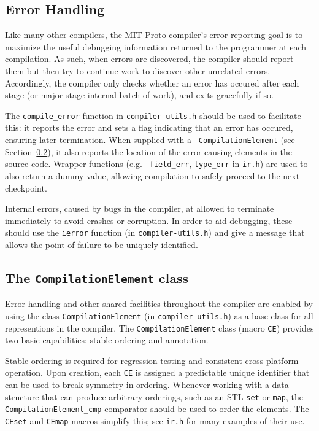 \documentclass{article}
\newcommand\file[1]{{\tt #1}}
\begin{document}
\subsection{Error Handling}

Like many other compilers, the MIT Proto compiler's error-reporting goal is to
maximize the useful debugging information returned to the programmer at each
compilation.  As such, when errors are discovered, the compiler should report
them but then try to continue work to discover other unrelated errors.
Accordingly, the compiler only checks whether an error has occured after each
stage (or major stage-internal batch of work), and exits gracefully if so.

The {\tt compile\_error} function in \file{compiler-utils.h} should be used to
facilitate this: it reports the error and sets a flag indicating that an error
has occured, ensuring later termination.  When supplied with a {\tt
CompilationElement} (see Section~\ref{s:ce}), it also reports the location of
the error-causing elements in the source code.  Wrapper functions (e.g. {\tt
field\_err}, {\tt type\_err} in \file{ir.h}) are used to also return a dummy
value, allowing compilation to safely proceed to the next checkpoint.

Internal errors, caused by bugs in the compiler, at allowed to terminate
immediately to avoid crashes or corruption.  In order to aid debugging, these
should use the {\tt ierror} function (in \file{compiler-utils.h}) and give a
message that allows the point of failure to be uniquely identified.

\subsection{The {\tt CompilationElement} class}
\label{s:ce}

Error handling and other shared facilities throughout the compiler are enabled
by using the class {\tt CompilationElement} (in \file{compiler-utils.h}) as a
base class for all representions in the compiler.  The {\tt CompilationElement}
class (macro {\tt CE}) provides two basic capabilities: stable ordering
and annotation.

Stable ordering is required for regression testing and consistent cross-platform
operation.  Upon creation, each {\tt CE} is assigned a predictable unique
identifier that can be used to break symmetry in ordering.  Whenever working with a
data-structure that can produce arbitrary orderings, such as an STL {\tt set} or
{\tt map}, the {\tt CompilationElement\_cmp} comparator should be used to order
the elements.  The {\tt CEset} and {\tt CEmap} macros simplify this; see
\file{ir.h} for many examples of their use.
\end{document}
